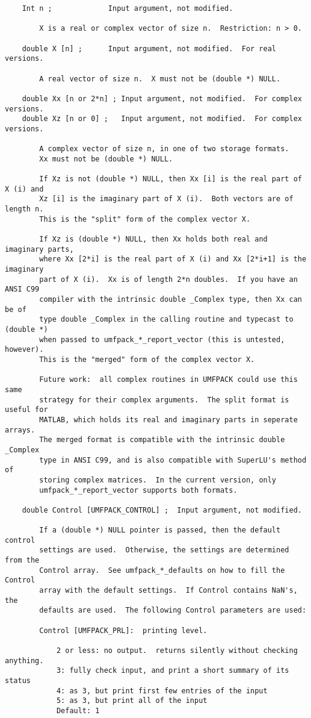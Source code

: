 {\begin{verbatim}
    Int n ;             Input argument, not modified.

        X is a real or complex vector of size n.  Restriction: n > 0.

    double X [n] ;      Input argument, not modified.  For real versions.

        A real vector of size n.  X must not be (double *) NULL.

    double Xx [n or 2*n] ; Input argument, not modified.  For complex versions.
    double Xz [n or 0] ;   Input argument, not modified.  For complex versions.

        A complex vector of size n, in one of two storage formats.
        Xx must not be (double *) NULL.

        If Xz is not (double *) NULL, then Xx [i] is the real part of X (i) and
        Xz [i] is the imaginary part of X (i).  Both vectors are of length n.
        This is the "split" form of the complex vector X.

        If Xz is (double *) NULL, then Xx holds both real and imaginary parts,
        where Xx [2*i] is the real part of X (i) and Xx [2*i+1] is the imaginary
        part of X (i).  Xx is of length 2*n doubles.  If you have an ANSI C99
        compiler with the intrinsic double _Complex type, then Xx can be of
        type double _Complex in the calling routine and typecast to (double *)
        when passed to umfpack_*_report_vector (this is untested, however).
        This is the "merged" form of the complex vector X.

        Future work:  all complex routines in UMFPACK could use this same
        strategy for their complex arguments.  The split format is useful for
        MATLAB, which holds its real and imaginary parts in seperate arrays.
        The merged format is compatible with the intrinsic double _Complex
        type in ANSI C99, and is also compatible with SuperLU's method of
        storing complex matrices.  In the current version, only 
        umfpack_*_report_vector supports both formats.

    double Control [UMFPACK_CONTROL] ;  Input argument, not modified.

        If a (double *) NULL pointer is passed, then the default control
        settings are used.  Otherwise, the settings are determined from the
        Control array.  See umfpack_*_defaults on how to fill the Control
        array with the default settings.  If Control contains NaN's, the
        defaults are used.  The following Control parameters are used:

        Control [UMFPACK_PRL]:  printing level.

            2 or less: no output.  returns silently without checking anything.
            3: fully check input, and print a short summary of its status
            4: as 3, but print first few entries of the input
            5: as 3, but print all of the input
            Default: 1
\end{verbatim}
}

